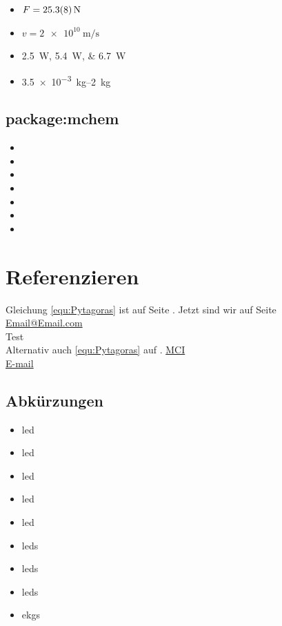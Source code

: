 \documentclass[a4paper, ngerman, oneside, 10pt]{article}
\begin{document}
\begin{itemize}
	\item $F=\SI{25,3 \pm 0,8}{\newton}$
	\item $v=\SI{2e10}{\m \per \s}$
	\item \SIlist{2,5;5,4;6,7}{\watt}
	\item \SIrange{3,5e-3}{2}{\kilo\g}
\end{itemize}

\subsection{package:mchem}
\begin{itemize}
	\item {}
	\item {} 
	\item {}
	\item {}
	\item {} 
	\item {}
	\item {} 
\end{itemize}


\section{Referenzieren}\label{sec:ref}
Gleichung \ref{equ:Pytagoras} ist auf Seite \pageref{equ:Pytagoras}. Jetzt sind wir auf Seite \pageref{sec:ref}\\
\href{mailto:mail@mail.mail}{Email@Email.com}\\
Test \cite{Kleiner.2022}\\
Alternativ auch \autoref{equ:Pytagoras} auf .
\href{https://www.mci.edu/de/}{MCI}\\
\href{mailto:jkdshf@dlsijkj.at}{E-mail}


\subsection{Abkürzungen}

\begin{itemize}
	\item \ac{led}		%
	\item \ac{led}		%
	\item \acf{led}		%
	\item \acl{led}		%
	\item \acs{led}		%
	\item \acp{led}		%
	\item \aclp{led}	%
	\item \acfp{led}	%
	\item \acp{ekg}		%
\end{itemize}
\end{document}

